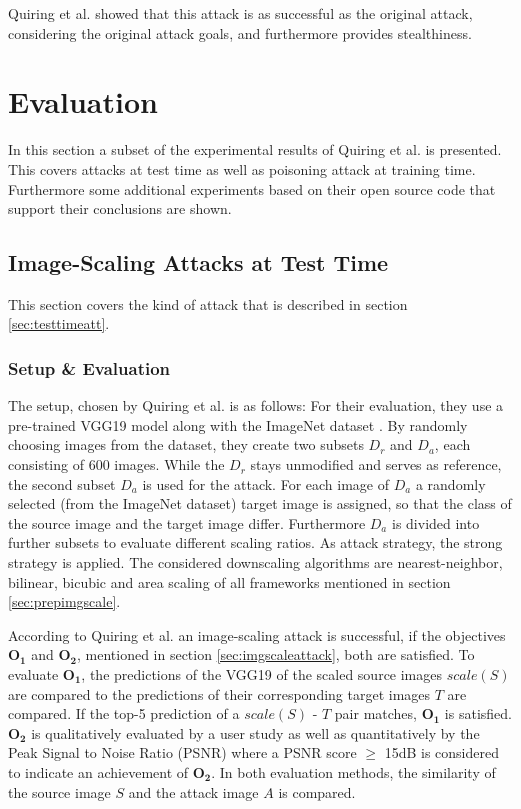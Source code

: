 \documentclass[sigconf]{acmart}
\begin{document}
Quiring et al. showed that this attack is as successful as the original attack, considering the original attack goals, and furthermore provides stealthiness.

\section{Evaluation}
In this section a subset of the experimental results of Quiring et al.\cite{imgscale, imgscalepoison} is presented.
This covers attacks at test time as well as poisoning attack at training time.
Furthermore some additional experiments based on their open source code that support their conclusions are shown.

\subsection{Image-Scaling Attacks at Test Time}
This section covers the kind of attack that is described in section \ref{sec:testtimeatt}.

\subsubsection{Setup \& Evaluation}
The setup, chosen by Quiring et al.\cite{imgscale} is as follows:
For their evaluation, they use a pre-trained VGG19 model \cite{DBLP:journals/corr/SimonyanZ14a} along with the ImageNet dataset \cite{ILSVRC15}.
By randomly choosing images from the dataset, they create two subsets $D_r$ and $D_a$, each consisting of 600 images.
While the $D_r$ stays unmodified and serves as reference, the second subset $D_a$ is used for the attack.
For each image of $D_a$ a randomly selected (from the ImageNet dataset) target image is assigned, so that the class of the source image and the target image differ.
Furthermore $D_a$ is divided into further subsets to evaluate different scaling ratios.
As attack strategy, the strong strategy is applied.
The considered downscaling algorithms are nearest-neighbor, bilinear, bicubic and area scaling of all frameworks mentioned in section \ref{sec:prepimgscale}.

According to Quiring et al. an image-scaling attack is successful, if the objectives $\boldsymbol{O_1}$ and $\boldsymbol{O_2}$, mentioned in section \ref{sec:imgscaleattack}, both are satisfied.
To evaluate $\boldsymbol{O_1}$, the predictions of the VGG19 of the scaled source images $scale(S)$ are compared to the predictions of their corresponding target images $T$ are compared.
If the top-5 prediction of a $scale(S)$ - $T$ pair matches, $\boldsymbol{O_1}$ is satisfied.
$\boldsymbol{O_2}$ is qualitatively evaluated by a user study as well as quantitatively by the Peak Signal to Noise Ratio (PSNR) where a PSNR score $\geq$ 15dB is considered to indicate an achievement of $\boldsymbol{O_2}$.
In both evaluation methods, the similarity of the source image $S$ and the attack image $A$ is compared.
\end{document}
